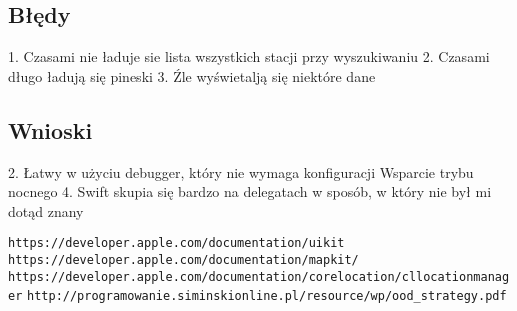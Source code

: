 \documentclass[a4paper,11pt,titlepage]{article}
\begin{document}
\subsection{Błędy}
1. Czasami nie ładuje sie lista wszystkich stacji przy wyszukiwaniu
2. Czasami długo ładują się pineski
3. Źle wyświetalją się niektóre dane

\subsection{Wnioski}
2. Łatwy w użyciu debugger, który nie wymaga konfiguracji
Wsparcie trybu nocnego
4. Swift skupia się bardzo na delegatach w sposób, w który nie był mi dotąd znany

\newpage
{}
\listoffigures
\newpage

\begin{thebibliography}{9}
\verb|https://developer.apple.com/documentation/uikit|
\verb|https://developer.apple.com/documentation/mapkit/|
\verb|https://developer.apple.com/documentation/corelocation/cllocationmanager|
\verb|http://programowanie.siminskionline.pl/resource/wp/ood_strategy.pdf|



\end{thebibliography}
\end{document}
